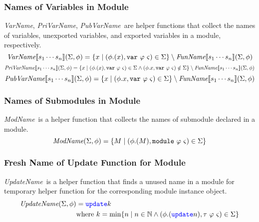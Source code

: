 \documentclass[a4paper]{article}
\newcommand{\var}{{\tt{var}}}
\newcommand{\module}{{\tt{module}}}
\newcommand{\code}[1]{\textcolor{blue}{\tt #1}}
\newcommand{\Where}{\mbox{where}}
\newcommand{\FunName}{\emph{FunName}}
\newcommand{\VarName}{\emph{VarName}}
\newcommand{\PriVarName}{\emph{PriVarName}}
\newcommand{\PubVarName}{\emph{PubVarName}}
\newcommand{\ModName}{\emph{ModName}}
\newcommand{\UpdateName}{\emph{UpdateName}}
\newcommand{\N}{\mathbb{N}}
\begin{document}
\subsubsection{Names of Variables in Module}
\VarName, \PriVarName, \PubVarName\ are helper functions that collect the names of variables, unexported variables, and exported variables in a module, respectively.
\begin{equation*}
\VarName \llbracket s_1 \cdots s_n \rrbracket (\Sigma, \phi) = \{ x \mid (\phi.(x), \var\ \varphi\ \varsigma) \in \Sigma \} \setminus \FunName \llbracket s_1 \cdots s_n \rrbracket (\Sigma, \phi)
\end{equation*}
\begin{equation*}
\PriVarName \llbracket s_1 \cdots s_n \rrbracket (\Sigma, \phi) = \{ x \mid (\phi.(x), \var\ \varphi\ \varsigma) \in \Sigma \wedge (\phi.x, \var\ \varphi\ \varsigma) \notin \Sigma\} \setminus \FunName \llbracket s_1 \cdots s_n \rrbracket (\Sigma, \phi)
\end{equation*}
\begin{equation*}
\PubVarName \llbracket s_1 \cdots s_n \rrbracket (\Sigma, \phi) = \{ x \mid (\phi.x, \var\ \varphi\ \varsigma) \in \Sigma \} \setminus \FunName \llbracket s_1 \cdots s_n \rrbracket (\Sigma, \phi)
\end{equation*}

\subsubsection{Names of Submodules in Module}
\ModName\ is a helper function that collects the names of submodule declared in a module.
\begin{equation*}
\ModName (\Sigma, \phi) = \{ M \mid (\phi.(M), \module\ \varphi\ \varsigma) \in \Sigma \}
\end{equation*}

\subsubsection{Fresh Name of Update Function for Module}
\UpdateName\ is a helper function that finds a unused name in a module for temporary helper function for the corresponding module instance object.
\begin{equation*}
\begin{split}
\UpdateName (\Sigma, \phi) & = \code{update}k \\
                           & \Where\ k = \min\{ n \mid n \in \N \wedge (\phi.(\code{update}n), \tau\ \varphi\ \varsigma) \in \Sigma \}
\end{split}
\end{equation*}
\end{document}
